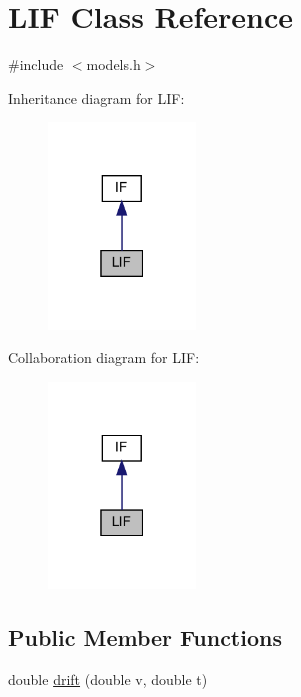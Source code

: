 \hypertarget{classLIF}{}\section{L\+IF Class Reference}
\label{classLIF}


{\ttfamily \#include $<$models.\+h$>$}



Inheritance diagram for L\+IF\+:\nopagebreak
\begin{figure}[H]
\begin{center}
\leavevmode
\includegraphics[width=111pt]{classLIF__inherit__graph}
\end{center}
\end{figure}


Collaboration diagram for L\+IF\+:\nopagebreak
\begin{figure}[H]
\begin{center}
\leavevmode
\includegraphics[width=111pt]{classLIF__coll__graph}
\end{center}
\end{figure}
\subsection*{Public Member Functions}
\begin{DoxyCompactItemize}
\item 
double \hyperlink{classLIF_aea677a0cf3f943edb7a957479e18d6dc}{drift} (double v, double t)
\end{DoxyCompactItemize}
